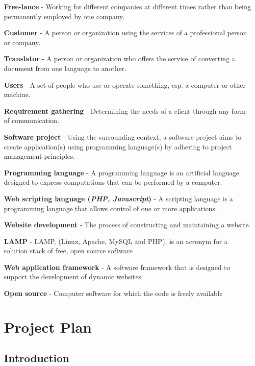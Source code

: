 \documentclass{l3proj}
\begin{document}
\begin{itemize}
\small{
\item{\textbf{Free-lance} - Working for different companies at different times rather than being permanently employed by one company.} 
\item{\textbf{Customer} - A person or organization using the services of a professional person or company.}
\item{\textbf{Translator} - A person or organization who offers the service of converting a document from one language to another.}
\item{\textbf{Users} - A set of people who use or operate something, esp. a computer or other machine.}
\item{\textbf{Requirement gathering} - Determining the needs of a client through any form of communication.}
\item{\textbf{Software project} - Using the surrounding context, a software project aims to create application(s) using programming language(s) by adhering to project management principles.}
\item{\textbf{Programming language} - A programming language is an artificial language designed to express computations that can be performed by a computer.}
\item{\textbf{Web scripting language (\textit{PHP, Javascript})} - A scripting language is a programming language that allows control of one or more applications.}
\item{\textbf{Website development} - The process of constructing and maintaining a website.}
\item{\textbf{LAMP} - LAMP, (Linux, Apache, MySQL and PHP), is an acronym for a solution stack of free, open source software}
\item{\textbf{Web application framework} - A software framework that is designed to support the development of dynamic websites }
\item{\textbf{Open source} - Computer software for which the code is freely available }
}
\end{itemize}
\chapter{Project Plan}

\section{Introduction}
\end{document}

